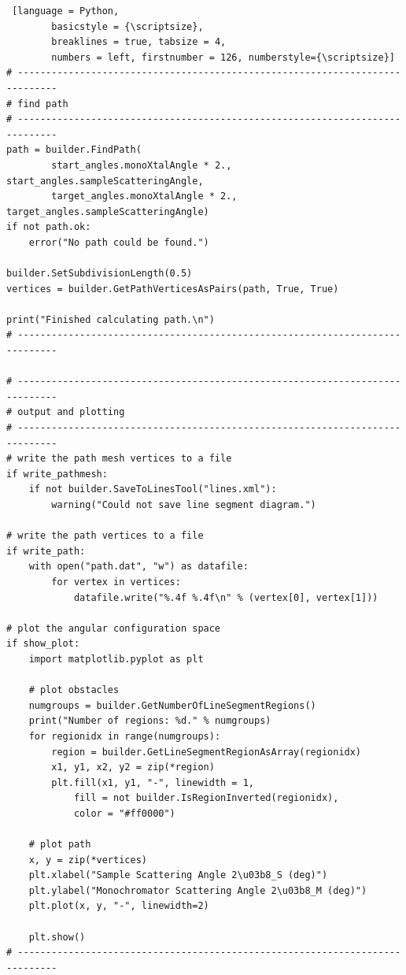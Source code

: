 \begin{listing}[htb]
	\begin{lstlisting} [language = Python, 
		basicstyle = {\scriptsize},
		breaklines = true, tabsize = 4,
		numbers = left, firstnumber = 126, numberstyle={\scriptsize}]
# -----------------------------------------------------------------------------
# find path
# -----------------------------------------------------------------------------
path = builder.FindPath(
		start_angles.monoXtalAngle * 2., start_angles.sampleScatteringAngle,
		target_angles.monoXtalAngle * 2., target_angles.sampleScatteringAngle)
if not path.ok:
	error("No path could be found.")

builder.SetSubdivisionLength(0.5)
vertices = builder.GetPathVerticesAsPairs(path, True, True)

print("Finished calculating path.\n")
# -----------------------------------------------------------------------------

# -----------------------------------------------------------------------------
# output and plotting
# -----------------------------------------------------------------------------
# write the path mesh vertices to a file
if write_pathmesh:
	if not builder.SaveToLinesTool("lines.xml"):
		warning("Could not save line segment diagram.")

# write the path vertices to a file
if write_path:
	with open("path.dat", "w") as datafile:
		for vertex in vertices:
			datafile.write("%.4f %.4f\n" % (vertex[0], vertex[1]))

# plot the angular configuration space
if show_plot:
	import matplotlib.pyplot as plt

	# plot obstacles
	numgroups = builder.GetNumberOfLineSegmentRegions()
	print("Number of regions: %d." % numgroups)
	for regionidx in range(numgroups):
		region = builder.GetLineSegmentRegionAsArray(regionidx)
		x1, y1, x2, y2 = zip(*region)
		plt.fill(x1, y1, "-", linewidth = 1,
			fill = not builder.IsRegionInverted(regionidx), 
			color = "#ff0000")

	# plot path
	x, y = zip(*vertices)
	plt.xlabel("Sample Scattering Angle 2\u03b8_S (deg)")
	plt.ylabel("Monochromator Scattering Angle 2\u03b8_M (deg)")
	plt.plot(x, y, "-", linewidth=2)

	plt.show()
# -----------------------------------------------------------------------------

	\end{lstlisting}
	\caption[Python workflow example 3/3.]{Script showing an example workflow in \textit{Python}.
	Part 3 of 3: Calculation of the path between the start end target positions and plotting.
	\label{lst:pyworkflow3}}
\end{listing}


